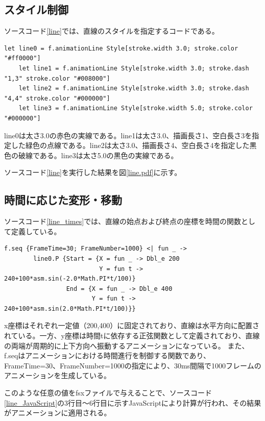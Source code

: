 \subsection{スタイル制御}\label{subsec:style}
ソースコード\ref{line}では、直線のスタイルを指定するコードである。
\begin{lstlisting}[caption={直線のスタイル（fsxファイル）},label={line},breaklines=true,breakatwhitespace=false]
    let line0 = f.animationLine Style[stroke.width 3.0; stroke.color "#ff0000"]
    let line1 = f.animationLine Style[stroke.width 3.0; stroke.dash "1,3" stroke.color "#008000"]
    let line2 = f.animationLine Style[stroke.width 3.0; stroke.dash "4,4" stroke.color "#000000"]
    let line3 = f.animationLine Style[stroke.width 5.0; stroke.color "#000000"]
\end{lstlisting}
line0は太さ3.0の赤色の実線である。line1は太さ3.0、描画長さ1、空白長さ3を指定した緑色の点線である。line2は太さ3.0、描画長さ4、空白長さ4を指定した黒色の破線である。line3は太さ5.0の黒色の実線である。
\par
ソースコード\ref{line}を実行した結果を図\ref{line.pdf}に示す。

\subsection{時間に応じた変形・移動}\label{subsec:times}
ソースコード\ref{line_times}では、直線の始点および終点の座標を時間の関数として定義している。
 \begin{lstlisting}[caption={時間に応じた移動（fsxファイル）},label={line_times},breaklines=true,breakatwhitespace=false]
f.seq {FrameTime=30; FrameNumber=1000} <| fun _ ->
        line0.P {Start = {X = fun _ -> Dbl_e 200
                          Y = fun t -> 240+100*asm.sin(-2.0*Math.PI*t/100)}
                 End = {X = fun _ -> Dbl_e 400
                        Y = fun t -> 240+100*asm.sin(2.0*Math.PI*t/100)}}
\end{lstlisting}
x座標はそれぞれ一定値（200,400）に固定されており、直線は水平方向に配置されている。一方、y座標は時間tに依存する正弦関数として定義されており、直線の両端が周期的に上下方向へ振動するアニメーションになっている。
また、f.seqはアニメーションにおける時間進行を制御する関数であり、FrameTime=30、FrameNumber=1000の指定により、30ms間隔で1000フレームのアニメーションを生成している。
\par
このような任意の値をfsxファイルで与えることで、ソースコード\ref{line_JavaScript}の3行目～6行目に示すJavaScriptにより計算が行われ、その結果がアニメーションに適用される。

